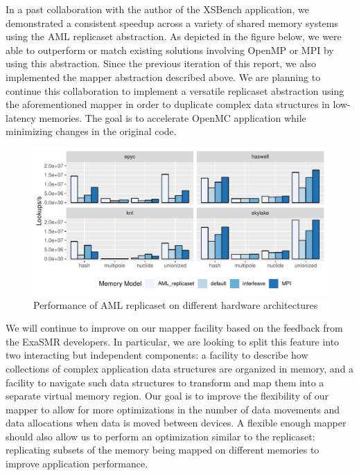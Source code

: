 In a past collaboration with the author of the XSBench application, we
demonstrated a consistent speedup across a variety of shared memory systems
using the AML replicaset abstraction. As depicted in the figure below, we were
able to outperform or match existing solutions involving OpenMP or MPI by
using this abstraction. Since the previous iteration of this report, we
also implemented the mapper abstraction described above. We are planning to
continue this collaboration to implement a versatile replicaset abstraction
using the aforementioned mapper in order to duplicate complex data
structures in low-latency memories. The goal is to accelerate OpenMC
application while minimizing changes in the original code.
\begin{figure}[htb]
\centering
\includegraphics[width=.8\textwidth]{projects/2.3.1-PMR/2.3.1.19-Argo-PowerSteering/aml-xsbench}
\caption{Performance of AML replicaset on different hardware
architectures}
\end{figure}

We will continue to improve on our mapper facility based on the feedback
from the ExaSMR developers. In particular, we are looking to split this
feature into two interacting but independent components: a facility to
describe how collections of complex application data structures are
organized in memory, and a facility to navigate such data structures to
transform and map them into a separate virtual memory region. Our goal is
to improve the flexibility of our mapper to allow for more optimizations in
the number of data movements and data allocations when data is moved
between devices. A flexible enough mapper should also allow us to perform
an optimization similar to the replicaset: replicating subsets of the
memory being mapped on different memories to improve application
performance.
